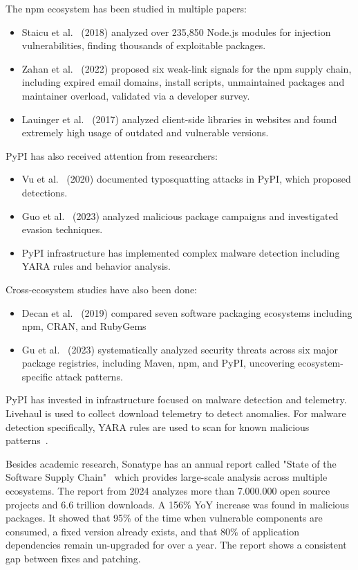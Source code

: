 The npm ecosystem has been studied in multiple papers:
\begin{itemize}
	\item Staicu et al.~\cite{staicu2018synode} (2018) analyzed over 235,850 Node.js modules for injection vulnerabilities, finding thousands of exploitable packages.
	\item Zahan et al.~\cite{zahan2022npm} (2022) proposed six weak-link signals for the npm supply chain, including expired email domains, install scripts, unmaintained packages and maintainer overload, validated via a developer survey.
	\item Lauinger et al.~\cite{lauinger2017thou} (2017) analyzed client-side libraries in websites and found extremely high usage of outdated and vulnerable versions.
\end{itemize}

PyPI has also received attention from researchers:
\begin{itemize}
	\item Vu et al.~\cite{vu2020pypi} (2020) documented typosquatting attacks in PyPI, which proposed detections.
	\item Guo et al.~\cite{guo2023pypi} (2023) analyzed malicious package campaigns and investigated evasion techniques.
	\item PyPI infrastructure has implemented complex malware detection including YARA rules and behavior analysis.
\end{itemize}

Cross-ecosystem studies have also been done:
\begin{itemize}
	\item Decan et al.~\cite{decan2019empirical} (2019) compared seven software packaging ecosystems including npm, CRAN, and RubyGems
	\item Gu et al.~\cite{gu2023packagethreats} (2023) systematically analyzed security threats across six major package registries, including Maven, npm, and PyPI, uncovering ecosystem-specific attack patterns.
\end{itemize}

PyPI has invested in infrastructure focused on malware detection and telemetry. Livehaul is used to collect download telemetry to detect anomalies. For malware detection specifically, YARA rules are used to scan for known malicious patterns~\cite{PyPI2023security}.

Besides academic research, Sonatype has an annual report called "State of the Software Supply Chain"~\cite{sonatype2024} which provides large-scale analysis across multiple ecosystems. The report from 2024 analyzes more than 7.000.000 open source projects and 6.6 trillion downloads. A 156\% YoY increase was found in malicious packages. It showed that 95\% of the time when vulnerable components are consumed, a fixed version already exists, and that 80\% of application dependencies remain un-upgraded for over a year. The report shows a consistent gap between fixes and patching.

